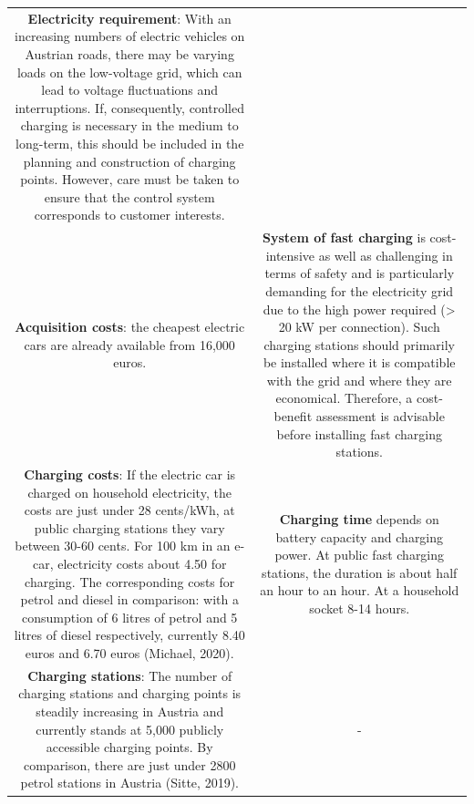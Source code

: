\documentclass[
]{book}
\begin{document}
\begin{longtable}[]{@{}cc@{}}
\begin{minipage}[t]{0.47\columnwidth}
\textbf{Electricity requirement}: With an increasing numbers of electric vehicles on Austrian roads, there may be varying loads on the low-voltage grid, which can lead to voltage fluctuations and interruptions. If, consequently, controlled charging is necessary in the medium to long-term, this should be included in the planning and construction of charging points. However, care must be taken to ensure that the control system corresponds to customer interests.\strut
\end{minipage}\tabularnewline
\begin{minipage}[t]{0.47\columnwidth}\centering
\textbf{Acquisition costs}: the cheapest electric cars are already available from 16,000 euros.\strut
\end{minipage} & \begin{minipage}[t]{0.47\columnwidth}\centering
\textbf{System of fast charging} is cost-intensive as well as challenging in terms of safety and is particularly demanding for the electricity grid due to the high power required (\textgreater{} 20 kW per connection). Such charging stations should primarily be installed where it is compatible with the grid and where they are economical. Therefore, a cost-benefit assessment is advisable before installing fast charging stations.\strut
\end{minipage}\tabularnewline
\begin{minipage}[t]{0.47\columnwidth}\centering
\textbf{Charging costs}: If the electric car is charged on household electricity, the costs are just under 28 cents/kWh, at public charging stations they vary between 30-60 cents. For 100 km in an e-car, electricity costs about 4.50 for charging. The corresponding costs for petrol and diesel in comparison: with a consumption of 6 litres of petrol and 5 litres of diesel respectively, currently 8.40 euros and 6.70 euros (Michael, 2020).\strut
\end{minipage} & \begin{minipage}[t]{0.47\columnwidth}\centering
\textbf{Charging time} depends on battery capacity and charging power. At public fast charging stations, the duration is about half an hour to an hour. At a household socket 8-14 hours.\strut
\end{minipage}\tabularnewline
\begin{minipage}[t]{0.47\columnwidth}\centering
\textbf{Charging stations}: The number of charging stations and charging points is steadily increasing in Austria and currently stands at 5,000 publicly accessible charging points. By comparison, there are just under 2800 petrol stations in Austria (Sitte, 2019).\strut
\end{minipage} & \begin{minipage}[t]{0.47\columnwidth}\centering
-\strut
\end{minipage}\tabularnewline
\bottomrule
\end{longtable}
\end{document}
